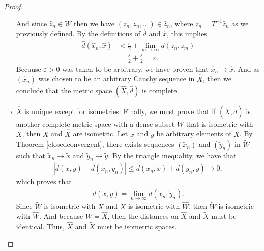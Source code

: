 \documentclass[11pt]{article}
\theoremstyle{mystyle}
\begin{document}
\begin{proof}
\begin{enumerate}[(a)]
And since $\hat{z}_n \in W$ then we have $(z_n, z_n, \ldots) \in \hat{z}_n$, where $z_n = T^{-1}\hat{z}_n$ as we previously defined. By the definitions of $\hat{d}$ and $\hat{x}$, this implies
\begin{align*}
    \hat{d}(\hat{x}_n, \hat{x}) &< \frac{\varepsilon}{2} + \lim_{m \to \infty}d(z_n, z_m)\\
    &= \frac{\varepsilon}{2} + \frac{\varepsilon}{2} = \varepsilon.
\end{align*}
Because $\varepsilon > 0$ was taken to be arbitrary, we have proven that $\hat{x}_n \longrightarrow \hat{x}$. And as $(\hat{x}_n)$ was chosen to be an arbitrary Cauchy sequence in $\hat{X}$, then we conclude that the metric space $(\hat{X}, \hat{d})$ is complete.

\item $\hat{X}$ is unique except for isometries:\newline
Finally, we must prove that if $(\tilde{X}, \tilde{d})$ is another complete metric space with a dense subset $\tilde{W}$ that is isometric with $X$, then $\tilde{X}$ and $\hat{X}$ are isometric. Let $\tilde{x}$ and $\tilde{y}$ be arbitrary elements of $\tilde{X}$. By Theorem \ref{closedconvergent}, there exists sequences $(\tilde{x}_n)$ and $(\tilde{y}_n)$ in $\tilde{W}$ such that $\tilde{x}_n \longrightarrow \tilde{x}$ and $\tilde{y}_n \longrightarrow \tilde{y}$. By the triangle inequality, we have that 
\begin{align*}
    |\tilde{d}(\tilde{x}, \tilde{y}) - \tilde{d}(\tilde{x}_n, \tilde{y}_n)| \leq \tilde{d}(\tilde{x}_n, \tilde{x}) + \tilde{d}(\tilde{y}_n, \tilde{y}) \longrightarrow 0,
\end{align*}
which proves that
\begin{align*}
    \tilde{d}(\tilde{x}, \tilde{y}) = \lim_{n \longrightarrow \infty} \tilde{d}(\tilde{x}_n, \tilde{y}_n).
\end{align*}
Since $\tilde{W}$ is isometric with $X$ and $X$ is isometric with $\hat{W}$, then $\tilde{W}$ is isometric with $\hat{W}$. And because $\bar{W} = \hat{X}$, then the distances on $\hat{X}$ and $\tilde{X}$ must be identical. Thus, $\hat{X}$ and $\tilde{X}$ must be isometric spaces.
\end{enumerate}
\end{proof}
\end{document}
